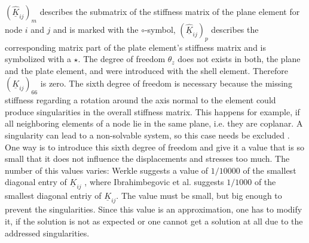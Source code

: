  $\left(\underline{\hat{K}}_{ij}\right)_m$ describes the submatrix of the stiffness matrix of the plane element for node $i$ and $j$ and is marked with the $\circ$-symbol, $\left(\underline{\hat{K}}_{ij}\right)_p$ describes the corresponding matrix part of the plate element's stiffness matrix and is symbolized with a $\star$.
 The degree of freedom $\theta_z$ does not exists in both, the plane and the plate element, and were introduced with the shell element. Therefore $(\underline{K}_{ij})_{66}$ is zero. The sixth degree of freedom is necessary because the missing stiffness regarding a rotation around the axis normal to the element could produce singularities in the overall stiffness matrix. This happens for example, if all neighboring elements of a node lie in the same plane, i.e. they are coplanar. A singularity can lead to a non-solvable system, so this case needs be excluded \cite{steinke2005finite}. One way is to introduce this sixth degree of freedom and give it a value that is so small that it does not influence the displacements and stresses too much. The number of this values varies: Werkle suggests a value of $1/10000$ of the smallest diagonal entry of $\underline{K}_{ij}$ \cite{werkle1995finite}, where Ibrahimbegovic et al. suggests $1/1000$ of the smallest diagonal entriy of $\underline{K}_{ij}$. The value must be small, but big enough to prevent the singularities. Since this value is an approximation, one has to modify it, if the solution is not as expected or one cannot get a solution at all due to the addressed singularities. %
 
